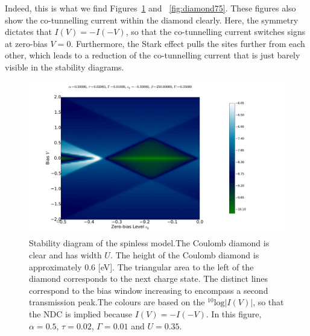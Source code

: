 Indeed, this is what we find Figures~\ref{fig:diamond50} and ~\ref{fig:diamond75}. These figures also show the co-tunnelling current within the diamond clearly. Here, the symmetry dictates that $I(V)=-I(-V)$, so that the co-tunnelling current switches signs at zero-bias $V=0$. Furthermore, the Stark effect pulls the sites further from each other, which leads to a reduction of the co-tunnelling current that is just barely visible in the stability diagrams. 
\begin{figure}[htb]
    \centering
    \includegraphics[height=.38\textheight]{pdf/coulombd/current_map_diamond_alpha_05.pdf}
    \caption{Stability diagram of the spinless model.The Coulomb diamond is clear and has width $U$. The height of the Coulomb diamond is approximately $0.6$ [eV]. The triangular area to the left of the diamond corresponds to the next charge state. The distinct lines correspond to the bias window increasing to encompass a second transmission peak.The colours are based on the $^{10}\text{log}\left|I(V)\right|$, so that the NDC is implied because $I(V) = -I(-V)$. In this figure, $\alpha=0.5$, $\tau=0.02$, $\Gamma = 0.01$ and $U=0.35$.}
    \label{fig:diamond50}
\end{figure}
